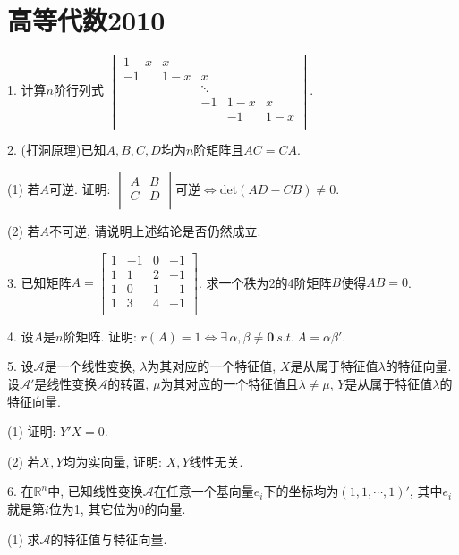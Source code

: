 \documentclass[12pt, a4paper, twoside]{ctexart}%
\begin{document}
	\section{高等代数2010}
	1. 计算$n$阶行列式 $\begin{vmatrix}
		1-x & x& & & \\
		-1 & 1-x& x& & \\
		& & \ddots& & \\
		& & -1& 1-x& x\\
		& & & -1&1-x\\
	\end{vmatrix}$.\par 
	2. (打洞原理)已知$A,B,C,D$均为$n$阶矩阵且$AC=CA$.\par 
	\hspace{1.2em}(1) 若$A$可逆. 证明: $\begin{vmatrix}
		A&B\\
		C&D\\
	\end{vmatrix}$可逆$\iff \mathrm{det}\left(AD-CB\right)\neq0$.\par 
	\hspace{1.2em}(2) 若$A$不可逆, 请说明上述结论是否仍然成立.\par
	3. 已知矩阵$A=\begin{bmatrix}
		1&-1&0&-1\\
		1&1&2&-1\\
		1&0&1&-1\\
		1&3&4&-1\\
	\end{bmatrix}$. 求一个秩为2的4阶矩阵$B$使得$AB=0$. \par
	4. 设$A$是$n$阶矩阵. 证明: $r(A)=1\iff \exists\,\alpha,\beta\neq \mathbf{0}\ s.t.\ A=\alpha\beta'$.\par 
	5. 设$\mathscr{A}$是一个线性变换, $\lambda$为其对应的一个特征值, $X$是从属于特征值$\lambda$的特征向量. 设$\mathscr{A}'$是线性变换$\mathscr{A}$的转置, $\mu$为其对应的一个特征值且$\lambda\neq\mu$, $Y$是从属于特征值$\lambda$的特征向量. \par
	\hspace{1.2em}(1) 证明: $Y'X=0$.\par 
	\hspace{1.2em}(2) 若$X,Y$均为实向量, 证明: $X,Y$线性无关. \par 
	6. 在$\mathbb{R}^n$中, 已知线性变换$\mathscr{A}$在任意一个基向量$e_i$下的坐标均为$\left(1,1,\cdots,1\right)'$, 其中$e_i$就是第$i$位为1, 其它位为0的向量. \par
	\hspace{1.2em}(1) 求$\mathscr{A}$的特征值与特征向量. \par
\end{document}
